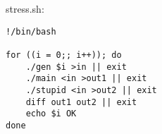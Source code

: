 stress.sh:
\begin{verbatim}
!/bin/bash

for ((i = 0;; i++)); do
	./gen $i >in || exit
	./main <in >out1 || exit
	./stupid <in >out2 || exit
	diff out1 out2 || exit
	echo $i OK
done
\end{verbatim}
